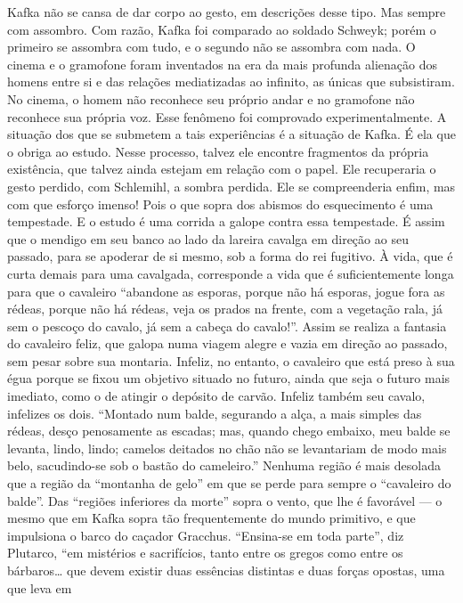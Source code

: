 Kafka não se cansa de dar corpo ao gesto, em descrições desse tipo. Mas
sempre com assombro. Com razão, Kafka foi comparado ao soldado Schweyk;
porém o primeiro se assombra com tudo, e o segundo não se assombra com
nada. O cinema e o gramofone foram inventados na era da mais profunda
alienação dos homens entre si e das relações mediatizadas ao infinito,
as únicas que subsistiram. No cinema, o homem não reconhece seu próprio
andar e no gramofone não reconhece sua própria voz. Esse fenômeno foi
comprovado experimentalmente. A situação dos que se submetem a tais
experiências é a situação de Kafka. É ela que o obriga ao estudo. Nesse
processo, talvez ele encontre fragmentos da própria existência, que
talvez ainda estejam em relação com o papel. Ele recuperaria o gesto
perdido, com Schlemihl, a sombra perdida. Ele se compreenderia enfim,
mas com que esforço imenso! Pois o que sopra dos abismos do esquecimento
é uma tempestade. E o estudo é uma corrida a galope contra essa
tempestade. É assim que o mendigo em seu banco ao lado da lareira
cavalga em direção ao seu passado, para se apoderar de si mesmo, sob a
forma do rei fugitivo. À vida, que é curta demais para uma cavalgada,
corresponde a vida que é suficientemente longa para que o cavaleiro
``abandone as esporas, porque não há esporas, jogue fora as rédeas,
porque não há rédeas, veja os prados na frente, com a vegetação rala, já
sem o pescoço do cavalo, já sem a cabeça do cavalo!''. Assim se realiza
a fantasia do cavaleiro feliz, que galopa numa viagem alegre e vazia em
direção ao passado, sem pesar sobre sua montaria. Infeliz, no entanto, o
cavaleiro que está preso à sua égua porque se fixou um objetivo situado
no futuro, ainda que seja o futuro mais imediato, como o de atingir o
depósito de carvão. Infeliz também seu cavalo, infelizes os dois.
``Montado num balde, segurando a alça, a mais simples das rédeas, desço
penosamente as escadas; mas, quando chego embaixo, meu balde se levanta,
lindo, lindo; camelos deitados no chão não se levantariam de modo mais
belo, sacudindo-se sob o bastão do cameleiro.'' Nenhuma região é mais
desolada que a região da ``montanha de gelo'' em que se perde para
sempre o ``cavaleiro do balde''. Das ``regiões inferiores da morte''
sopra o vento, que lhe é favorável --- o mesmo que em Kafka sopra tão
frequentemente do mundo primitivo, e que impulsiona o barco do caçador
Gracchus. ``Ensina-se em toda parte'', diz Plutarco, ``em mistérios e
sacrifícios, tanto entre os gregos como entre os bárbaros\ldots{} que devem
existir duas essências distintas e duas forças opostas, uma que leva em
